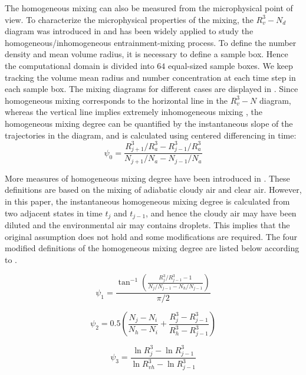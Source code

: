 The homogeneous mixing can also be measured from the microphysical point of view. 
To characterize the microphysical properties of the mixing, the $R_v^3-N_d$ 
diagram was introduced in \cite{Burnet2007Observational} and has been widely applied to study the
homogeneous/inhomogeneous entrainment-mixing process. To define the number 
density and mean volume radius, it is necessary to define a sample box. Hence 
the computational domain is divided into $64$ equal-sized sample boxes. We keep 
tracking the volume mean radius and number concentration at each time step in 
each sample box. The mixing diagrams for different cases are displayed in 
. Since homogeneous mixing corresponds to the horizontal 
line in the $R_v^3-N$ diagram, whereas the vertical line implies extremely inhomogeneous 
mixing \cite{Andrejczuk2009}, the homogeneous mixing degree can be quantified by the instantaneous slope 
of the trajectories in the diagram, and is calculated using centered differencing 
in time:
\begin{equation}
\psi_0 = \frac{R_{j+1}^3/R_a^3 - R_{j-1}^3/R_a^3}{N_{j+1}/N_a - N_{j-1}/N_a}
\label{phi0}
\end{equation}

More measures of homogeneous mixing degree have been introduced in \cite{Lu2011, Lu2014}. 
These definitions are based on the mixing of adiabatic cloudy air and clear air. 
However, in this paper, the instantaneous homogeneous mixing degree is calculated from 
two adjacent states in time $t_j$ and $t_{j-1}$, and hence the cloudy air may have been 
diluted and the environmental air may contains droplets. This implies that the original 
assumption does not hold and some modifications are required. The four modified definitions 
of the homogeneous mixing degree are listed below according to \cite{Lu2011, Lu2014}.

\begin{equation}
\psi_1 = \frac{\tan^{-1}(\frac{R_{j}^3/R_{j-1}^3 - 1}{N_j/N_{j-1} - N_h/N_{j-1}})}{\pi/2}
\label{phi1}
\end{equation}

\begin{equation}
\psi_2 = 0.5(\frac{N_j-N_{i}}{N_h-N_i} + \frac{R_j^3-R_{j-1}^3}{R_h^3 - R_{j-1}^3})
\label{phi2}
\end{equation}

\begin{equation}
\psi_3 = \frac{\ln R_j^3 - \ln R_{j-1}^3}{\ln R_{vh}^3 - \ln R_{j-1}^3}
\label{phi3}
\end{equation}

